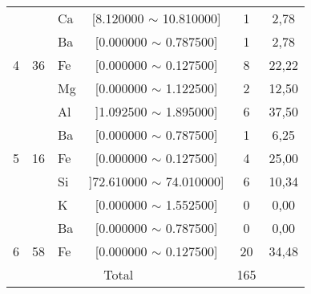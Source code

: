 \begin{apendicesenv}
\begin{table}[H]
{{\begin{tabular}{cclccc}
 &  & Ca  & [8.120000 $\sim$ 10.810000]  & 1 & 2,78\\  
 &  & Ba  & [0.000000 $\sim$ 0.787500]  & 1 & 2,78\\  
\multirow{-9}{*}{4} & \multirow{-9}{*}{36}& Fe  & [0.000000 $\sim$ 0.127500]  & 8 & 22,22\\  \hline
 &  & Mg  & [0.000000 $\sim$ 1.122500]  & 2 & 12,50\\  
 &  & Al  & ]1.092500 $\sim$ 1.895000]  & 6 & 37,50\\  
 &  & Ba  & [0.000000 $\sim$ 0.787500]  & 1 & 6,25\\  
\multirow{-4}{*}{5} & \multirow{-4}{*}{16} & Fe & [0.000000 $\sim$ 0.127500]  & 4 & 25,00\\  \hline
 &  & Si  & ]72.610000 $\sim$ 74.010000]  & 6 & 10,34\\  
 &  & K   & [0.000000 $\sim$ 1.552500]  & 0 & 0,00\\  
 &  & Ba  & [0.000000 $\sim$ 0.787500]  & 0 & 0,00\\  
\multirow{-4}{*}{6} & \multirow{-4}{*}{58} &Fe  & [0.000000 $\sim$ 0.127500]  & 20 & 34,48\\  \hline
\multicolumn{4}{c}{Total}                             & 165  & \\ \hline
\end{tabular}
} %
} %
\end{table}
\end{apendicesenv}
